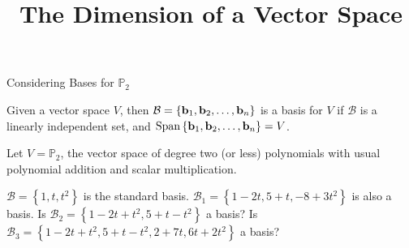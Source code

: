\documentclass[xcolor=dvipsnames,aspectratio=169,t]{beamer}
\title{The Dimension of a Vector Space}
\begin{document}
\maketitle

\begin{frame}{Considering Bases for $\mathbb{P}_2$}

Given a vector space $V$,  then $\mathcal{B} = \left\{ \mathbf{b}_1 ,  \mathbf{b}_2, \ldots ,  \mathbf{b}_n \right\} $ is a \alert{basis for $V$} if
\bb
\ii $\mathcal{B}$ is a linearly independent set, and
\ii $\mbox{Span} \left\{ \mathbf{b}_1 ,  \mathbf{b}_2, \ldots ,  \mathbf{b}_n \right\} = V$.
\ee

\begin{example}
Let $V = \mathbb{P}_2$, the vector space of degree two (or less) polynomials with usual polynomial addition and scalar multiplication.

\bi
\ii $\mathcal{B} = \left\{ 1 , t , t^2 \right\}$ is the standard basis. \smallskip
\ii $\mathcal{B}_1 = \left\{ 1-2t , 5+t , -8+3t^2 \right\}$ is also a basis. \smallskip
\ii Is $\mathcal{B}_2 = \left\{ 1-2t+t^2 , 5+t-t^2 \right\}$ a basis? \smallskip
\ii Is $\mathcal{B}_3 = \left\{ 1-2t+t^2 , 5+t-t^2, 2+7t, 6t+2t^2 \right\}$ a basis? 
\ei

\end{example}
\end{frame}
\end{document}
